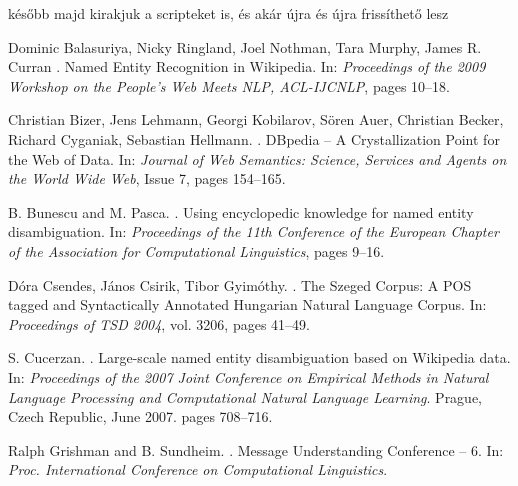 \documentclass[11pt]{article}
\begin{document}
később majd kirakjuk a scripteket is, és akár újra és újra frissíthető lesz




\begin{thebibliography}{}

Dominic Balasuriya, Nicky Ringland, Joel Nothman, Tara Murphy, James R. Curran
.
\newblock Named Entity Recognition in Wikipedia.
\newblock In: {\em Proceedings of the 2009 Workshop on the People's Web Meets NLP, ACL-IJCNLP}, pages 10--18.

Christian Bizer, Jens Lehmann, Georgi Kobilarov, Sören Auer, Christian Becker, Richard Cyganiak, Sebastian Hellmann.
.
\newblock DBpedia -- A Crystallization Point for the Web of Data. 
\newblock In: {\em Journal of Web Semantics: Science, Services and Agents on the World Wide Web}, Issue 7, pages 154--165.

B. Bunescu and M. Pasca.
.
\newblock Using encyclopedic knowledge for named entity disambiguation.
\newblock In: {\em Proceedings of the 11th Conference of the European Chapter of the Association for Computational Linguistics}, pages 9--16.

Dóra Csendes, János Csirik, Tibor Gyimóthy.
.
\newblock The Szeged Corpus: A POS tagged and Syntactically Annotated Hungarian Natural Language Corpus. 
\newblock In: {\em Proceedings of TSD 2004}, vol. 3206, pages 41--49.

S. Cucerzan.
.
\newblock Large-scale named entity disambiguation based on Wikipedia data.
\newblock In: {\em Proceedings of the 2007 Joint Conference on Empirical Methods in Natural Language Processing and Computational Natural Language Learning}.
\newblock Prague, Czech Republic, June 2007. pages 708--716.

Ralph Grishman and B. Sundheim.
.
\newblock Message Understanding Conference -- 6. 
\newblock In: {\em Proc. International Conference on Computational Linguistics}.


\end{thebibliography}
\end{document}
